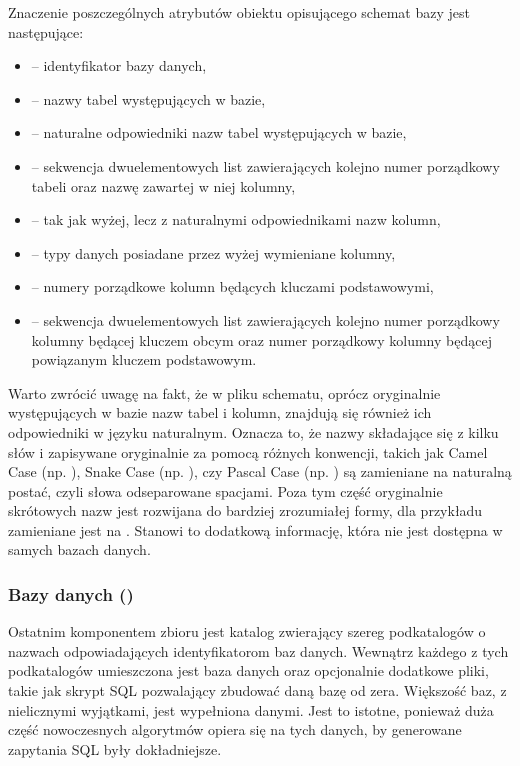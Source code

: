 \begin{minipage}{\linewidth}

\end{minipage}

Znaczenie poszczególnych atrybutów obiektu opisującego schemat bazy jest następujące:\nobreakpar
\begin{itemize}
    \item \textbf{} -- identyfikator bazy danych,
    \item \textbf{} -- nazwy tabel występujących w bazie,
    \item \textbf{} -- naturalne odpowiedniki nazw tabel występujących w bazie,
    \item \textbf{} -- sekwencja dwuelementowych list zawierających kolejno numer porządkowy tabeli oraz nazwę zawartej w niej kolumny,
    \item \textbf{} -- tak jak wyżej, lecz z naturalnymi odpowiednikami nazw kolumn,
    \item \textbf{} -- typy danych posiadane przez wyżej wymieniane kolumny,
    \item \textbf{} -- numery porządkowe kolumn będących kluczami podstawowymi,
    \item \textbf{} -- sekwencja dwuelementowych list zawierających kolejno numer porządkowy kolumny będącej kluczem obcym oraz numer porządkowy kolumny będącej powiązanym kluczem podstawowym.
\end{itemize}

Warto zwrócić uwagę na fakt, że w pliku schematu, oprócz oryginalnie występujących w bazie nazw tabel i kolumn, znajdują się również ich odpowiedniki w języku naturalnym. Oznacza to, że nazwy składające się z kilku słów i zapisywane oryginalnie za pomocą różnych konwencji, takich jak Camel Case (np. ), Snake Case (np. ), czy Pascal Case (np. ) są zamieniane na naturalną postać, czyli słowa odseparowane spacjami. Poza tym część oryginalnie skrótowych nazw jest rozwijana do bardziej zrozumiałej formy, dla przykładu  zamieniane jest na . Stanowi to dodatkową informację, która nie jest dostępna w samych bazach danych.

\subsubsection{Bazy danych ()}
Ostatnim komponentem zbioru  jest katalog  zwierający szereg podkatalogów o nazwach odpowiadających identyfikatorom baz danych. Wewnątrz każdego z tych podkatalogów umieszczona jest baza danych  oraz opcjonalnie dodatkowe pliki, takie jak skrypt SQL pozwalający zbudować daną bazę od zera. Większość baz, z nielicznymi wyjątkami, jest wypełniona danymi. Jest to istotne, ponieważ duża część nowoczesnych algorytmów opiera się na tych danych, by generowane zapytania SQL były dokładniejsze.

